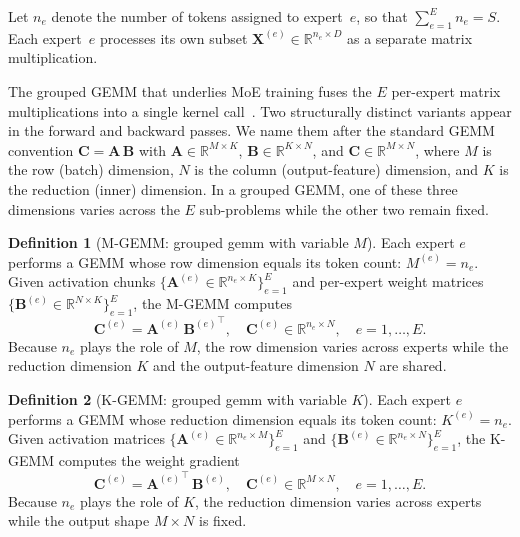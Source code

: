 \documentclass[11pt,a4paper]{article}
\theoremstyle{definition}
\newtheorem{definition}{Definition}
\begin{document}
Let $n_e$ denote the number of tokens assigned to expert~$e$, so that
$\sum_{e=1}^{E} n_e = S$. Each expert~$e$ processes its own subset
$\mathbf{X}^{(e)} \in \mathbb{R}^{n_e \times D}$ as a separate matrix
multiplication.

The grouped GEMM that underlies MoE training fuses the $E$ per-expert
matrix multiplications into a single kernel
call~\cite{gale2023megablocks,nvidia2026megatronmoe}.
Two structurally distinct variants appear in the forward and backward passes.
We name them after the standard GEMM convention
$\mathbf{C} = \mathbf{A}\,\mathbf{B}$ with
$\mathbf{A} \in \mathbb{R}^{M \times K}$,
$\mathbf{B} \in \mathbb{R}^{K \times N}$, and
$\mathbf{C} \in \mathbb{R}^{M \times N}$,
where $M$ is the row (batch) dimension, $N$ is the column
(output-feature) dimension, and $K$ is the reduction (inner) dimension.
In a grouped GEMM, one of these three dimensions varies across the $E$
sub-problems while the other two remain fixed.

\begin{definition}[M-GEMM: grouped gemm with variable $M$]
\label{def:mgemm}
Each expert $e$ performs a GEMM whose row dimension equals its token
count: $M^{(e)} = n_e$.
Given activation chunks
$\{\mathbf{A}^{(e)} \in \mathbb{R}^{n_e \times K}\}_{e=1}^{E}$
and per-expert weight matrices
$\{\mathbf{B}^{(e)} \in \mathbb{R}^{N \times K}\}_{e=1}^{E}$,
the M-GEMM computes
\begin{equation}
  \mathbf{C}^{(e)} = \mathbf{A}^{(e)}\,{\mathbf{B}^{(e)}}^{\!\top},
  \quad \mathbf{C}^{(e)} \in \mathbb{R}^{n_e \times N},
  \quad e = 1, \dots, E.
\label{eq:mgemm}
\end{equation}
Because $n_e$ plays the role of $M$, the row dimension varies across
experts while the reduction dimension $K$ and the output-feature
dimension $N$ are shared.
\end{definition}

\begin{definition}[K-GEMM: grouped gemm with variable $K$]
\label{def:kgemm}
Each expert $e$ performs a GEMM whose reduction dimension equals its
token count: $K^{(e)} = n_e$.
Given activation matrices
$\{\mathbf{A}^{(e)} \in \mathbb{R}^{n_e \times M}\}_{e=1}^{E}$
and
$\{\mathbf{B}^{(e)} \in \mathbb{R}^{n_e \times N}\}_{e=1}^{E}$,
the K-GEMM computes the weight gradient
\begin{equation}
  \mathbf{C}^{(e)} = {\mathbf{A}^{(e)}}^{\!\top}\,\mathbf{B}^{(e)},
  \quad \mathbf{C}^{(e)} \in \mathbb{R}^{M \times N},
  \quad e = 1, \dots, E.
\label{eq:kgemm}
\end{equation}
Because $n_e$ plays the role of $K$, the reduction dimension varies
across experts while the output shape $M \times N$ is fixed.
\end{definition}
\end{document}
